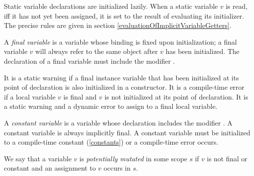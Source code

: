 \documentclass{article}
\begin{document}
\LMHash{}
Static variable declarations are initialized lazily.
When a static variable $v$ is read, if{}f it has not yet been assigned, it is set to the result of evaluating its initializer.
The precise rules are given in section \ref{evaluationOfImplicitVariableGetters}.


\LMHash{}
A {\em final variable} is a variable whose binding is fixed upon initialization; a final variable $v$ will always refer to the same object after $v$ has been initialized.
The declaration of a final variable must include the modifier \FINAL{}.

\LMHash{}
It is a static warning if a final instance variable that has been initialized at its point of declaration is also initialized in a constructor.
It is a compile-time error if a local variable $v$ is final and $v$ is not initialized at its point of declaration.
It is a static warning and a dynamic error to assign to a final local variable.


\LMHash{}
A {\em constant variable} is a variable whose declaration includes the modifier \CONST{}.
A constant variable is always implicitly final.
A constant variable must be initialized to a compile-time constant (\ref{constants}) or a compile-time error occurs.

\LMHash{}
We say that a variable $v$ is {\em potentially mutated} in some scope $s$ if $v$ is not final or constant and an assignment to $v$ occurs in $s$.
\end{document}
